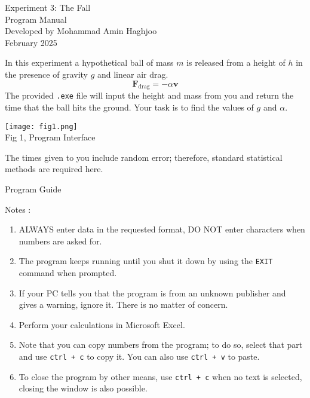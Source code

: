 \documentclass{article}
\begin{document}
\begin{center}
    \huge Experiment 3: The Fall\\
    \Large Program Manual\\
    \small Developed by Mohammad Amin Haghjoo \\
    \small February 2025
\end{center}



In this experiment a hypothetical ball of mass $m$ is released from a height of $h$ in the presence of gravity $g$ and linear air drag.
\begin{equation}
    \textbf{F}_{\text{drag}}=-\alpha \textbf{v}
\end{equation}
The provided \texttt{.exe} file will input the height and mass from you and return the time that the ball hits the ground. Your task is to find the values of $g$ and $\alpha$.
\begin{center}
    \texttt{[image: fig1.png]} \\
    Fig 1, Program Interface
\end{center}
The times given to you include random error; therefore, standard statistical methods are required here.
\begin{center}
    \huge Program Guide
\end{center}
Notes :
\begin{enumerate}
    \item ALWAYS enter data in the requested format, DO NOT enter characters when numbers are asked for.
    \item The program keeps running until you shut it down by using the \texttt{EXIT} command when prompted.
    \item If your PC tells you that the program is from an unknown publisher and gives a warning, ignore it. There is no matter of concern.
    \item Perform your calculations in Microsoft Excel.
    \item Note that you can copy numbers from the program; to do so, select that part and use \texttt{ctrl + c} to copy it. You can also use \texttt{ctrl + v} to paste.
    \item To close the program by other means, use \texttt{ctrl + c} when no text is selected, closing the window is also possible.
\end{enumerate}

\vspace{0.4 cm}
\end{document}
